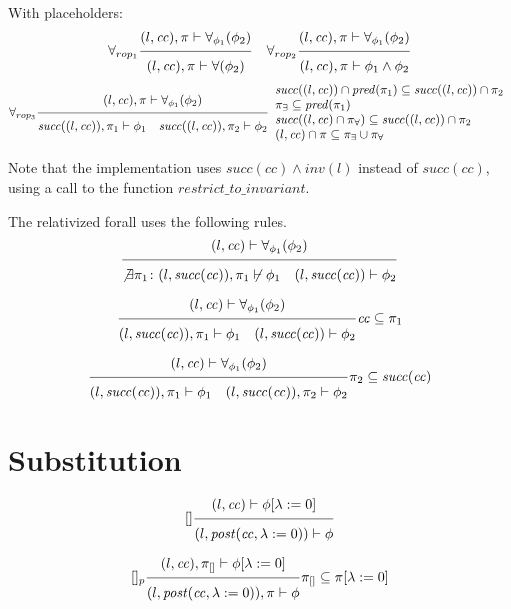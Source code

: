 \documentclass{article}
\newcommand{\proofrule}[3][]{#1 \frac{\raisebox{.7ex}{\normalsize{$#2$}}}
  {\raisebox{-1.0ex}{\normalsize{$#3$}}}}
\newcommand{\placeholder}[1][]{\pi_{#1}}
\newcommand{\loc}{l}
\newcommand{\region}{\mathit{cc}}
\newcommand{\suc}{\mathit{succ}}
\newcommand{\pre}{\mathit{pred}}
\newcommand{\inv}{\mathit{inv}}
\newcommand{\post}{\mathit{post}}
\begin{document}
With placeholders:
\[
\proofrule[\forall_{rop_1}]
{(\loc, \region), \placeholder \vdash \forall_{\phi_1}(\phi_2)}
{(\loc, \region), \placeholder \vdash \forall(\phi_2)}
%
\quad
%
\proofrule[\forall_{rop_2}]
{(\loc, \region), \placeholder \vdash \forall_{\phi_1}(\phi_2)}
{(\loc, \region), \placeholder \vdash \phi_1 \land \phi_2}
\]
\[
\proofrule[\forall_{rop_3}]
{(\loc, \region), \placeholder \vdash \forall_{\phi_1}(\phi_2)}
{\suc((\loc,\region)), \placeholder[1] \vdash \phi_1
\quad \suc((\loc,\region)), \placeholder[2] \vdash \phi_2
}
\begin{array}{l}
\suc((\loc, \region)) \cap \pre(\placeholder[1]) \subseteq \suc((\loc, \region)) \cap \placeholder[2]\\
\placeholder[\exists] \subseteq \pre(\placeholder[1])\\
\suc((\loc, \region) \cap \placeholder[\forall]) \subseteq \suc((\loc, \region)) \cap \placeholder[2] \\
(\loc, \region) \cap \placeholder \subseteq \placeholder[\exists] \cup \placeholder[\forall]
\end{array}
\]


Note that the implementation uses $\suc(\region) \land \inv(\loc)$ instead of $\suc(\region)$, using a call to the function $\mathit{restrict\_to\_invariant}$.

The relativized forall uses the following rules.
\[
\proofrule
{(\loc, \region) \vdash \forall_{\phi_1}(\phi_2)}
{\not \exists \placeholder[1] \colon (\loc, \suc(\region)), \placeholder[1] \not \vdash \phi_1
\quad (\loc, \suc(\region)) \vdash \phi_2}
\]

\[
\proofrule
{(\loc, \region) \vdash \forall_{\phi_1}(\phi_2)}
{(\loc, \suc(\region)), \placeholder[1] \vdash \phi_1
\quad (\loc, \suc(\region)) \vdash \phi_2}
\region \subseteq \placeholder[1]
\]

\[
\proofrule
{(\loc, \region) \vdash \forall_{\phi_1}(\phi_2)}
{(\loc, \suc(\region)), \placeholder[1] \vdash \phi_1
\quad (\loc, \suc(\region)), \placeholder[2] \vdash \phi_2
}
\placeholder[2] \subseteq \suc(\region)
\]


\section{Substitution}

\[
\proofrule[{[]}]
{(\loc, \region) \vdash \phi[\lambda := 0]}
{(\loc, \post(\region, \lambda := 0)) \vdash \phi}
\]

\[
\proofrule[{[]_p}]
{(\loc, \region), \placeholder[{[]}] \vdash \phi[\lambda := 0]}
{(\loc, \post(\region, \lambda := 0)), \placeholder \vdash \phi}
\placeholder[{[]}] \subseteq \placeholder[][\lambda := 0]
\]
\end{document}
